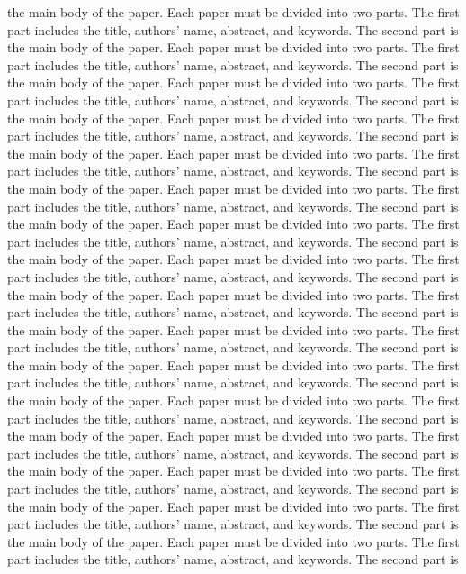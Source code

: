 \documentclass[fleqn,10pt,twocolumn]{ICCAS2018}
\begin{document}
the main body of the paper.
Each paper must be divided into two parts. The first part includes
the title, authors' name, abstract, and keywords. The second part is
the main body of the paper.
Each paper must be divided into two parts. The first part includes
the title, authors' name, abstract, and keywords. The second part is
the main body of the paper.
Each paper must be divided into two parts. The first part includes
the title, authors' name, abstract, and keywords. The second part is
the main body of the paper.
Each paper must be divided into two parts. The first part includes
the title, authors' name, abstract, and keywords. The second part is
the main body of the paper.
Each paper must be divided into two parts. The first part includes
the title, authors' name, abstract, and keywords. The second part is
the main body of the paper.
Each paper must be divided into two parts. The first part includes
the title, authors' name, abstract, and keywords. The second part is
the main body of the paper.
Each paper must be divided into two parts. The first part includes
the title, authors' name, abstract, and keywords. The second part is
the main body of the paper.
Each paper must be divided into two parts. The first part includes
the title, authors' name, abstract, and keywords. The second part is
the main body of the paper.
Each paper must be divided into two parts. The first part includes
the title, authors' name, abstract, and keywords. The second part is
the main body of the paper.
Each paper must be divided into two parts. The first part includes
the title, authors' name, abstract, and keywords. The second part is
the main body of the paper.
Each paper must be divided into two parts. The first part includes
the title, authors' name, abstract, and keywords. The second part is
the main body of the paper.
Each paper must be divided into two parts. The first part includes
the title, authors' name, abstract, and keywords. The second part is
the main body of the paper.
Each paper must be divided into two parts. The first part includes
the title, authors' name, abstract, and keywords. The second part is
the main body of the paper.
Each paper must be divided into two parts. The first part includes
the title, authors' name, abstract, and keywords. The second part is
the main body of the paper.
Each paper must be divided into two parts. The first part includes
the title, authors' name, abstract, and keywords. The second part is
the main body of the paper.
Each paper must be divided into two parts. The first part includes
the title, authors' name, abstract, and keywords. The second part is
\end{document}
